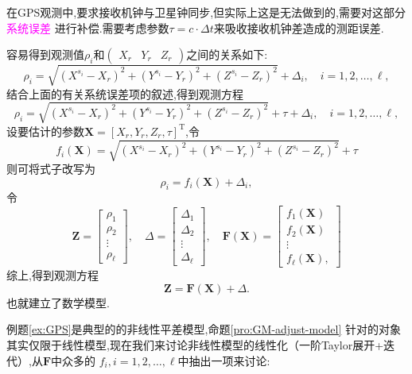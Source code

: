 \documentclass[cn,10pt,citestyle=gb7714-2015,bibstyle=gb7714-2015]{elegantbook}
\newcommand{\mT}{\mathrm{T}}
\renewcommand{\l}{\ell}
\begin{document}
\begin{note}
    在\textup{GPS}观测中,要求接收机钟与卫星钟同步,但实际上这是无法做到的,需要对这部分\textcolor{magenta}{系统误差}
    进行补偿.需要考虑参数$\tau=c\cdot\Delta t$来吸收接收机钟差造成的测距误差.
\end{note}
\begin{solution}
  容易得到观测值$\rho_i$和$\begin{pmatrix}
    X_r&Y_r&Z_r
  \end{pmatrix}$之间的关系如下:
  \[
      \rho_i=\sqrt{(X^{s_i}-X_r)^2+(Y^{s_i}-Y_r)^2+(Z^{s_i}-Z_r)^2}+\varDelta_i,\quad i=1,2,\ldots,\l,
  \]
  结合上面的有关系统误差项的叙述,得到观测方程
  \[
    \rho_i=\sqrt{(X^{s_i}-X_r)^2+(Y^{s_i}-Y_r)^2+(Z^{s_i}-Z_r)^2}+\tau+\varDelta_i,\quad i=1,2,\ldots,\l,
  \]
  设要估计的参数$\bm{X}=[X_r,Y_r,Z_r,\tau]^\mT$,令
  \[
      f_i(\bm{X})=\sqrt{(X^{s_i}-X_r)^2+(Y^{s_i}-Y_r)^2+(Z^{s_i}-Z_r)^2}+\tau
  \]
  则可将式子改写为
  \begin{equation}
    \rho_i=f_i(\bm{X})+\varDelta_i,
  \end{equation}
  令
  \[
      \bm{Z}=\begin{bmatrix}
        \rho_1\\
        \rho_2\\
        \vdots\\
        \rho_\l
      \end{bmatrix},\quad
      \bm{\varDelta}=\begin{bmatrix}
        \varDelta_1\\
        \varDelta_2\\
        \vdots\\
        \varDelta_\l
      \end{bmatrix},\quad
      \bm{F}(\bm{X})=\begin{bmatrix}
        f_1(\bm{X})\\
        f_2(\bm{X})\\
        \vdots\\
        f_\l(\bm{X}),
      \end{bmatrix}
  \]
  综上,得到观测方程
  \begin{equation}
    \bm{Z}=\bm{F}(\bm{X})+\bm{\varDelta}.
  \end{equation}
  也就建立了数学模型.
\end{solution}
例题\ref{ex:GPS}是典型的的\colorbox{yellow!20}{非线性平差模型},命题\ref{pro:GM-adjust-model}
针对的对象其实仅限于线性模型,现在我们来讨论非线性模型的线性化（一阶\textup{Taylor}展开+迭代）,从$\bm{F}$中众多的
$f_i,i=1,2,\ldots,\l$中抽出一项来讨论:
\end{document}

